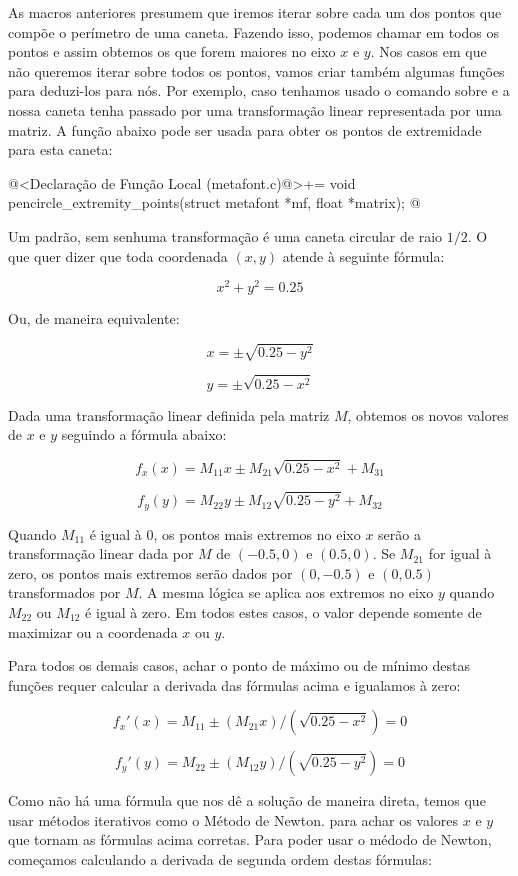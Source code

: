 {As macros anteriores presumem que iremos iterar sobre cada um dos
pontos que compõe o perímetro de uma caneta. Fazendo isso, podemos
chamar  em todos os pontos e assim
obtemos os que forem maiores no eixo $x$ e $y$. Nos casos em que não
queremos iterar sobre todos os pontos, vamos criar também algumas
funções para deduzi-los para nós. Por exemplo, caso tenhamos usado o
comando  sobre  e a nossa
caneta tenha passado por uma transformação linear representada por uma
matriz. A função abaixo pode ser usada para obter os pontos de
extremidade para esta caneta:

\iniciocodigo
@<Declaração de Função Local (metafont.c)@>+=
void pencircle_extremity_points(struct metafont *mf, float *matrix);
@
\fimcodigo

Um  padrão, sem senhuma transformação é uma
caneta circular de raio $1/2$. O que quer dizer que toda coordenada
$(x,y)$ atende à seguinte fórmula:

$$
x^2+y^2= 0.25
$$

Ou, de maneira equivalente:

$$
x=\pm\sqrt{0.25-y^2}
$$

$$
y=\pm\sqrt{0.25-x^2}
$$

Dada uma transformação linear definida pela matriz $M$, obtemos os novos
valores de $x$ e $y$ seguindo a fórmula abaixo:

$$
f_x(x) = M_{11}x \pm M_{21}\sqrt{0.25-x^2} + M_{31}
$$

$$
f_y(y) = M_{22}y \pm M_{12}\sqrt{0.25-y^2} + M_{32}
$$

Quando $M_{11}$ é igual à 0, os pontos mais extremos no eixo $x$ serão
a transformação linear dada por $M$ de $(-0.5, 0)$ e $(0.5, 0)$. Se
$M_{21}$ for igual à zero, os pontos mais extremos serão dados por
$(0, -0.5)$ e $(0, 0.5)$ transformados por $M$. A mesma lógica se
aplica aos extremos no eixo $y$ quando $M_{22}$ ou $M_{12}$ é igual à
zero. Em todos estes casos, o valor depende somente de maximizar ou a
coordenada $x$ ou $y$.

Para todos os demais casos, achar o ponto de máximo ou de mínimo
destas funções requer calcular a derivada das fórmulas acima e
igualamos à zero:

$$
f_x'(x)=M_{11} \pm (M_{21}x)/(\sqrt{0.25-x^2})=0
$$

$$
f_y'(y)=M_{22} \pm (M_{12}y)/(\sqrt{0.25-y^2})=0
$$

Como não há uma fórmula que nos dê a solução de maneira direta, temos
que usar métodos iterativos como o Método de Newton. para achar os
valores $x$ e $y$ que tornam as fórmulas acima corretas. Para poder
usar o médodo de Newton, começamos calculando a derivada de segunda
ordem destas fórmulas:

}
